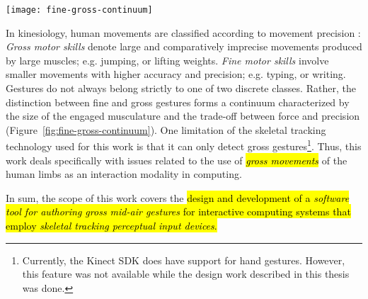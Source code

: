 \begin{SCfigure}[\sidecaptionrelwidth][t]
\centering
\texttt{[image: fine-gross-continuum]}
\caption{The continuum of \emph{fine} vs. \emph{gross} movements.}
\label{fig:fine-gross-continuum}
\end{SCfigure}

In kinesiology, human movements are classified according to movement precision \parencite{Haibach:2011}: \emph{Gross motor skills} denote large and comparatively imprecise movements produced by large muscles; e.g. jumping, or lifting weights. \emph{Fine motor skills} involve smaller movements with higher accuracy and precision; e.g. typing, or writing. Gestures do not always belong strictly to one of two discrete classes. Rather, the distinction between fine and gross gestures forms a continuum characterized by the size of the engaged musculature and the trade-off between force and precision \parencite{Edwards:2010} (Figure~\ref{fig:fine-gross-continuum}). One limitation of the skeletal tracking technology used for this work is that it can only detect gross gestures\footnote{Currently, the Kinect SDK does have support for hand gestures. However, this feature was not available while the design work described in this thesis was done.}. Thus, this work deals specifically with issues related to the use of \hl{\emph{gross movements}} of the human limbs as an interaction modality in computing.

In sum, the scope of this work covers the \hl{design and development of a \emph{software tool for authoring gross mid-air gestures} for interactive computing systems that employ \emph{skeletal tracking perceptual input devices}.}

